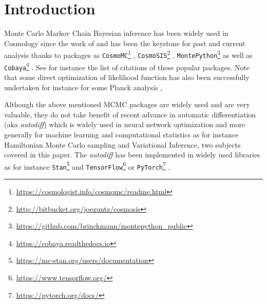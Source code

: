\documentclass[final,5p,times,twocolumn,authoryear]{elsarticle}
\begin{document}


\section{Introduction}
Monte Carlo Markov Chain Bayesian inference has been widely used in Cosmology since the work of \citep{2001ApJ...563L..95K,2003MNRAS.341.1084R} and has been the keystone for past and current analysis thanks to packages as  \texttt{CosmoMC}\footnote{\url{https://cosmologist.info/cosmomc/readme.html}} \citep{2002PhRvD..66j3511L}, \texttt{CosmoSIS}\footnote{\url{http://bitbucket.org/joezuntz/cosmosis}} \citep{2015A&C....12...45Z}, \texttt{MontePython}\footnote{\url{https://github.com/brinckmann/montepython_public}} \citep{2019PDU....24..260B} as well as   \texttt{Cobaya}\footnote{\url{https://cobaya.readthedocs.io}} \citep{2019ascl.soft10019T,2021JCAP...05..057T}. See for instance the list of citations of these popular packages. Note that some direct optimization of likelihood function has also been successfully undertaken for instance for some Planck analysis \citep{2014A&A...566A..54P}, 

Although the above mentioned MCMC packages are widely used and are very valuable, they do not take benefit of recent advance in automatic differentiation (aka \textit{autodiff}) \citep{2015arXiv150205767G, 2018arXiv181105031M} which is widely used in neural network optimization and more generally for machine learning and computational statistics as for instance Hamiltonian Monte Carlo sampling and Variational Inference, two subjects covered in this paper. The \textit{autodiff} has been implemented in widely used libraries as for instance \texttt{Stan}\footnote{\url{https://mc-stan.org/users/documentation}} \citep{JSSv076i01} and \texttt{TensorFlow}\footnote{\url{https://www.tensorflow.org/}}  \citep{tensorflow2015-whitepaper} or \texttt{PyTorch}\footnote{\url{https://pytorch.org/docs/}} \citep{NEURIPS2019_9015}. 
\end{document}
